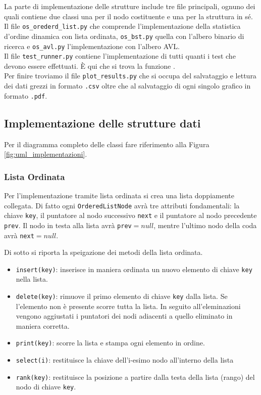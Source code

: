 La parte di implementazione delle strutture include tre file principali, ognuno dei quali contiene due classi una per il nodo costituente e una per la struttura in sé. Il file \texttt{os\_orederd\_list.py} che comprende l'implementazione della statistica d'ordine dinamica con lista ordinata, \texttt{os\_bst.py} quella con l'albero binario di ricerca e \texttt{os\_avl.py} l'implementazione con l'albero AVL. \\

Il file \texttt{test\_runner.py} contiene l'implementazione di tutti quanti i test che devono essere effettuati. È qui che si trova la funzione .\\
Per finire troviamo il file \texttt{plot\_results.py} che si occupa del salvataggio e lettura dei dati grezzi in formato \texttt{.csv} oltre che al salvataggio di ogni singolo grafico in formato \texttt{.pdf}.


\subsection{Implementazione delle strutture dati}
Per il diagramma completo delle classi fare riferimento alla Figura \ref{fig:uml_implementazioni}.



\subsubsection*{Lista Ordinata}
Per l'implementazione tramite lista ordinata si crea una lista doppiamente collegata. Di fatto ogni \texttt{OrderedListNode} avrà tre attributi fondamentali: la chiave \texttt{key}, il puntatore al nodo successivo \texttt{next} e il puntatore al nodo precedente \texttt{prev}. Il nodo in testa alla lista avrà \texttt{prev}$= null$, mentre l'ultimo nodo della coda avrà \texttt{next}$= null$.

Di sotto si riporta la speigazione dei metodi della lista ordinata.
\begin{itemize}
	\item \texttt{insert(key)}: inserisce in maniera ordinata un nuovo elemento di chiave \texttt{key} nella lista.
	\item \texttt{delete(key)}: rimuove il primo elemento di chiave \texttt{key} dalla lista. Se l'elemento non è presente scorre tutta la lista. In seguito all'eleminazioni vengono aggiustati i puntatori dei nodi adiacenti a quello eliminato in maniera corretta.
	\item \texttt{print(key)}: scorre la lista e stampa ogni elemento in ordine.
	\item \texttt{select(i)}: restituisce la chiave dell'i-esimo nodo all'interno della lista
	\item \texttt{rank(key)}: restituisce la posizione a partire dalla testa della lista (rango) del nodo di chiave \texttt{key}.
\end{itemize} 

